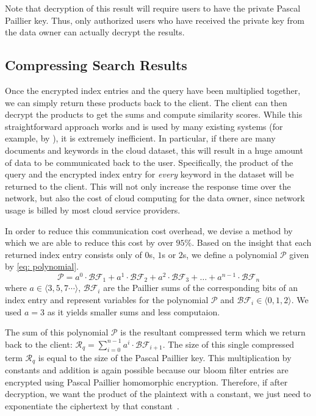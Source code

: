 Note that decryption of this result will require users to have the private Pascal 
Paillier key. Thus, only authorized users who have received the private key from the
data owner can actually decrypt the results.

\subsection{Compressing Search Results}

Once the encrypted index entries and the query have been multiplied together, 
we can simply return these products back to the client. The client can then decrypt the products to get the
sums and compute similarity scores. While this straightforward approach works and
is used by many existing systems (for example, by \cite{zeehan}), it is extremely
inefficient.
In particular, if there are many documents and keywords in the cloud dataset, this
will result in a huge amount of data to be communicated back to the user. Specifically,
the product of the query and the encrypted index entry for \textit{every} keyword in the dataset will be returned
to the client. This will not only increase the response time over the network, but
also the cost of cloud computing for the data owner, since network usage is billed
by most cloud service providers.

In order to reduce this communication cost overhead, we devise a method by which
we are able to reduce this cost by over $95\%$. Based on the insight that each returned
index entry consists only of $0$s, $1$s or $2$s, we
define a polynomial $\mathcal{P}$ given by \eqref{eq: polynomial}. 
\begin{equation}
\mathcal{P} = {a}^0\cdot\mathcal{BF}_1 + {a}^1\cdot\mathcal{BF}_2 +
{a}^2\cdot\mathcal{BF}_3 + \ldots + {a}^{n-1}\cdot\mathcal{BF}_n
  \label{eq: polynomial}
\end{equation}
where ${a} \in \langle 3,5,7 \cdots \rangle $, $\mathcal{BF}_i$  are the
Paillier sums of the corresponding bits of an index entry and represent variables for
the polynomial $\mathcal{P}$ and $\mathcal{BF}_i \in \langle 0,1,2 \rangle $. We
used ${a}=3$ as it yields smaller sums and less computaion.

The sum of this polynomial $\mathcal{P}$ is the resultant compressed term which we return back
to the client:
$
\mathcal{R}_q = \sum_{i=0}^{n-1} {a}^{i}\cdot\mathcal{BF}_{i+1}
$.
The size of this single compressed term $\mathcal{R}_q$
is equal to the size of the Pascal Paillier key. 
This multiplication by constants and addition is again possible 
because our bloom filter entries are encrypted using Pascal Paillier homomorphic
encryption. Therefore, if after decryption, we want the product of the plaintext with a constant, we
just need to exponentiate the ciphertext by that constant~\cite{pascal}.

